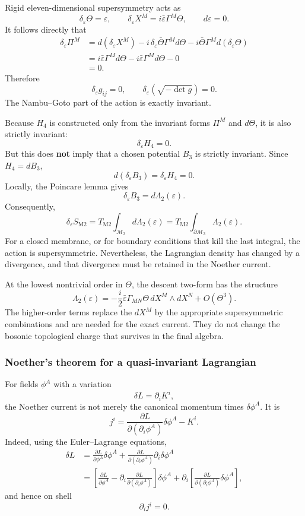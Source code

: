 \documentclass[
  10pt,
  a4paper,
  openany]{book}
\begin{document}
Rigid eleven-dimensional supersymmetry acts as \[
\delta_\varepsilon\Theta=\varepsilon,
\qquad
\delta_\varepsilon X^M
=i\bar\varepsilon\Gamma^M\Theta,
\qquad
d\varepsilon=0.
\] It follows directly that \[
\begin{aligned}
\delta_\varepsilon\Pi^M
&=d(\delta_\varepsilon X^M)
-i\,\delta_\varepsilon\bar\Theta\Gamma^M d\Theta
-i\bar\Theta\Gamma^M d(\delta_\varepsilon\Theta)\\
&=i\bar\varepsilon\Gamma^M d\Theta
-i\bar\varepsilon\Gamma^M d\Theta
-0\\
&=0.
\end{aligned}
\] Therefore \[
\delta_\varepsilon g_{ij}=0,
\qquad
\delta_\varepsilon
\left(\sqrt{-\det g}\right)=0.
\] The Nambu--Goto part of the action is exactly invariant.

Because \(H_4\) is constructed only from the invariant forms \(\Pi^M\)
and \(d\Theta\), it is also strictly invariant: \[
\delta_\varepsilon H_4=0.
\] But this does \textbf{not} imply that a chosen potential \(B_3\) is
strictly invariant. Since \(H_4=dB_3\), \[
d(\delta_\varepsilon B_3)
=\delta_\varepsilon H_4
=0.
\] Locally, the Poincare lemma gives \[
\boxed{
\delta_\varepsilon B_3=d\Lambda_2(\varepsilon)
}.
\] Consequently, \[
\delta_\varepsilon S_{\mathrm{M2}}
=T_{\mathrm{M2}}
\int_{\mathcal M_3}d\Lambda_2(\varepsilon)
=T_{\mathrm{M2}}
\int_{\partial\mathcal M_3}\Lambda_2(\varepsilon).
\] For a closed membrane, or for boundary conditions that kill the last
integral, the action is supersymmetric. Nevertheless, the Lagrangian
density has changed by a divergence, and that divergence must be
retained in the Noether current.

At the lowest nontrivial order in \(\Theta\), the descent two-form has
the structure \[
\Lambda_2(\varepsilon)
=-\frac{i}{2}
\bar\varepsilon\Gamma_{MN}\Theta\,
dX^M\wedge dX^N
+O(\Theta^3).
\] The higher-order terms replace the \(dX^M\) by the appropriate
supersymmetric combinations and are needed for the exact current. They
do not change the bosonic topological charge that survives in the final
algebra.

\subsubsection{Noether's theorem for a quasi-invariant
Lagrangian}\label{noethers-theorem-for-a-quasi-invariant-lagrangian}

For fields \(\phi^A\) with a variation \[
\delta L=\partial_iK^i,
\] the Noether current is not merely the canonical momentum times
\(\delta\phi^A\). It is \[
\boxed{
j^i
=\frac{\partial L}{\partial(\partial_i\phi^A)}
\delta\phi^A-K^i
}.
\] Indeed, using the Euler--Lagrange equations, \[
\begin{aligned}
\delta L
&=\frac{\partial L}{\partial\phi^A}\delta\phi^A
+\frac{\partial L}{\partial(\partial_i\phi^A)}
\partial_i\delta\phi^A\\
&=\left[
\frac{\partial L}{\partial\phi^A}
-\partial_i\frac{\partial L}{\partial(\partial_i\phi^A)}
\right]\delta\phi^A
+\partial_i\left[
\frac{\partial L}{\partial(\partial_i\phi^A)}
\delta\phi^A
\right],
\end{aligned}
\] and hence on shell \[
\partial_i j^i=0.
\]
\end{document}

